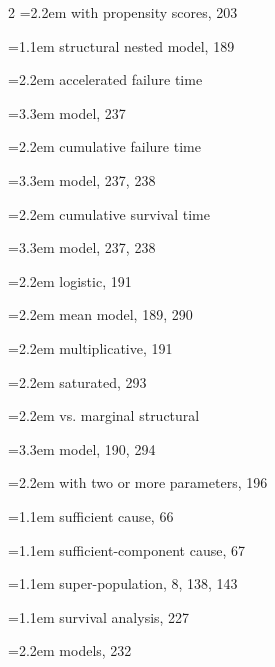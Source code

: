 \begin{multicols}{2}
\hspace*{1.1em}\hangindent=2.2em with propensity scores, 203\par
\hangindent=1.1em structural nested model, 189\par
\hspace*{1.1em}\hangindent=2.2em accelerated failure time\par
\hspace*{2.2em}\hangindent=3.3em model, 237\par
\hspace*{1.1em}\hangindent=2.2em cumulative failure time\par
\hspace*{2.2em}\hangindent=3.3em model, 237, 238\par
\hspace*{1.1em}\hangindent=2.2em cumulative survival time\par
\hspace*{2.2em}\hangindent=3.3em model, 237, 238\par
\hspace*{1.1em}\hangindent=2.2em logistic, 191\par
\hspace*{1.1em}\hangindent=2.2em mean model, 189, 290\par
\hspace*{1.1em}\hangindent=2.2em multiplicative, 191\par
\hspace*{1.1em}\hangindent=2.2em saturated, 293\par
\hspace*{1.1em}\hangindent=2.2em vs. marginal structural\par
\hspace*{2.2em}\hangindent=3.3em model, 190, 294\par
\hspace*{1.1em}\hangindent=2.2em with two or more parameters, 196\par
\hangindent=1.1em sufficient cause, 66\par
\hangindent=1.1em sufficient-component cause, 67\par
\hangindent=1.1em super-population, 8, 138, 143\par
\hangindent=1.1em survival analysis, 227\par
\hspace*{1.1em}\hangindent=2.2em models, 232\par

\end{multicols}
